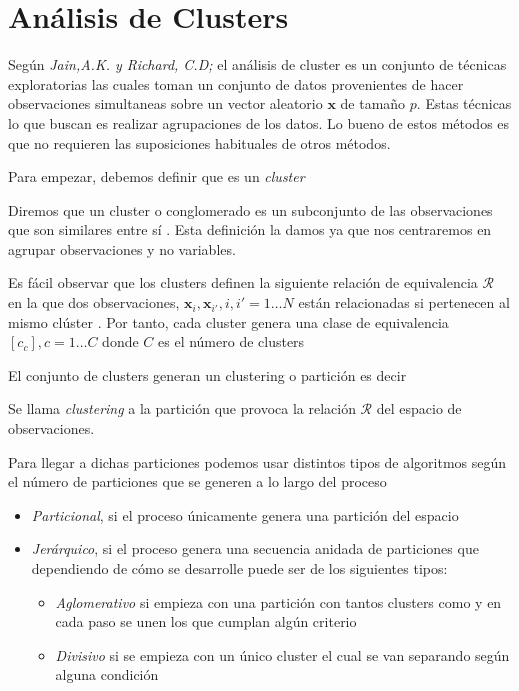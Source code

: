 \section{Análisis de Clusters}

\noindent Según \emph{Jain,A.K. y Richard, C.D; }\cite{Jain 1988} el análisis de cluster es un conjunto de técnicas exploratorias las cuales toman un conjunto de datos provenientes de hacer observaciones simultaneas  sobre un vector aleatorio $\mathbf{x}$ de tamaño $p$. Estas técnicas lo que buscan es realizar agrupaciones de los datos. Lo bueno de estos métodos es que no requieren las suposiciones habituales de otros métodos.

\noindent Para empezar, debemos definir que es un \emph{cluster}
\begin{defi}
Diremos que un cluster o conglomerado es un subconjunto de las observaciones que son similares entre sí \cite{Everitt 2011}. Esta definición la damos ya que nos centraremos en agrupar observaciones y no variables. 
\end{defi}

\noindent Es fácil observar que los clusters definen la siguiente relación de equivalencia $\mathcal{R}$ en la que dos observaciones, $\mathbf{x}_i,\mathbf{x}_{i'}, i,i'=1 \ldots N$ están relacionadas si pertenecen al mismo clúster \cite{Cuadras 2014}. Por tanto, cada cluster genera una clase de equivalencia $[c_c], c=1\ldots C$ donde $C$ es el número de clusters

\noindent El conjunto de clusters generan un clustering o partición es decir
\begin{defi}
Se llama \textit{clustering} a la partición que provoca la relación $\mathcal{R}$ del espacio de observaciones. 
\end{defi}

\noindent Para llegar a dichas particiones podemos usar distintos tipos de algoritmos según el número de particiones que se generen a lo largo del proceso \cite{Jain 1988}
\begin{itemize}
\item \emph{Particional}, si el proceso únicamente genera una partición del espacio 
\item \emph{Jerárquico}, si el proceso genera una secuencia anidada de particiones que dependiendo de cómo se desarrolle puede ser de los siguientes tipos:
\begin{itemize}
\item \emph{Aglomerativo} si empieza con una partición con tantos clusters como y en cada paso se unen los que cumplan algún criterio 
\item \emph{Divisivo} si se empieza con un único cluster el cual se van separando según alguna condición
\end{itemize}
\end{itemize}

